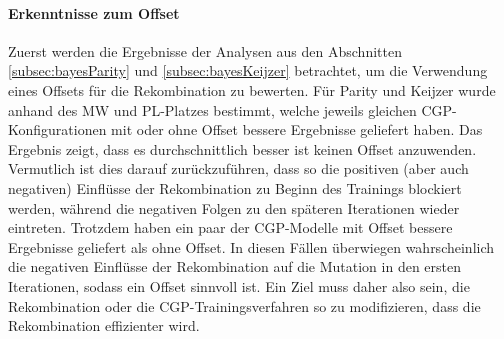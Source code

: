 \paragraph{Erkenntnisse zum Offset}
Zuerst werden die Ergebnisse der Analysen aus den Abschnitten \ref{subsec:bayesParity} und \ref{subsec:bayesKeijzer} betrachtet, um die Verwendung eines Offsets für die Rekombination zu bewerten.
Für Parity und Keijzer wurde anhand des MW und PL-Platzes bestimmt, welche jeweils gleichen CGP-Konfigurationen mit oder ohne Offset bessere Ergebnisse geliefert haben.
Das Ergebnis zeigt, dass es durchschnittlich besser ist keinen Offset anzuwenden.
Vermutlich ist dies darauf zurückzuführen, dass so die positiven (aber auch negativen) Einflüsse der Rekombination zu Beginn des Trainings blockiert werden, während die negativen Folgen zu den späteren Iterationen wieder eintreten.
Trotzdem haben ein paar der CGP-Modelle mit Offset bessere Ergebnisse geliefert als ohne Offset.
In diesen Fällen überwiegen wahrscheinlich die negativen Einflüsse der Rekombination auf die Mutation in den ersten Iterationen, sodass ein Offset sinnvoll ist.
Ein Ziel muss daher also sein, die Rekombination oder die CGP-Trainingsverfahren so zu modifizieren, dass die Rekombination effizienter wird.
